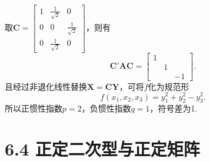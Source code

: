 \documentclass[compress,mathserif,cjk]{beamer}
\theoremstyle{remark}
\numberwithin{equation}{section}
\begin{document}
\begin{CJK}{UTF8}{gbsn}
\begin{frame}
取$\bm C=\left[\begin{matrix}1&\frac{1}{\sqrt2}&0\\0&0&\frac{1}{\sqrt2}\\0&\frac{1}{\sqrt2}&0\end{matrix}\right]$，则有
$$\bm C'\bm{AC}=\left[\begin{matrix}1&&\\&1&\\&&-1\end{matrix}\right].$$
且经过非退化线性替换$\bm X=\bm{CY}$，可将$f$化为规范形
$$f(x_1,x_2,x_3)=y_1^2+y_2^2-y_3^2.$$
所以正惯性指数$p=2$，负惯性指数$q=1$，符号差为1.
\end{frame}

\section[6.4]{6.4 正定二次型与正定矩阵}


\end{CJK}
\end{document}
